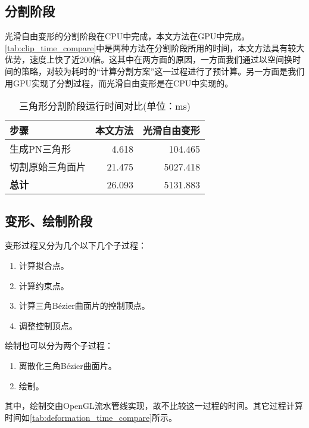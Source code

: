 \subsection{分割阶段}
光滑自由变形的分割阶段在CPU中完成，本文方法在GPU中完成。\autoref{tab:clip_time_compare}中是两种方法在分割阶段所用的时间，本文方法具有较大优势，速度上快了近200倍。这其中在两方面的原因，一方面我们通过以空间换时间的策略，对较为耗时的“计算分割方案”这一过程进行了预计算。另一方面是我们用GPU实现了分割过程，而光滑自由变形是在CPU中实现的。

\begin{table}[htbp]
    \centering
    \caption{三角形分割阶段运行时间对比(单位：ms)}\label{tab:clip_time_compare}
    \begin{tabular}{lrr}
    \toprule
    \textbf{步骤}   & \textbf{本文方法} & \textbf{光滑自由变形\cite{Cui15}} \\
    \midrule
    生成PN三角形    & 4.618             & 104.465                           \\
    切割原始三角面片& 21.475            & 5027.418                          \\
    \midrule
    \textbf{总计}   & 26.093            & 5131.883                          \\
    \bottomrule
    \end{tabular}
\end{table}

\subsection{变形、绘制阶段}
变形过程又分为几个以下几个子过程：
\begin{enumerate}
    \item 计算拟合点。
    \item 计算约束点。
    \item 计算三角Bézier曲面片的控制顶点。
    \item 调整控制顶点。
\end{enumerate}

绘制也可以分为两个子过程：
\begin{enumerate}
    \item 离散化三角Bézier曲面片。
    \item 绘制。
\end{enumerate}

其中，绘制交由OpenGL流水管线实现，故不比较这一过程的时间。其它过程计算时间如\autoref{tab:deformation_time_compare}所示。


